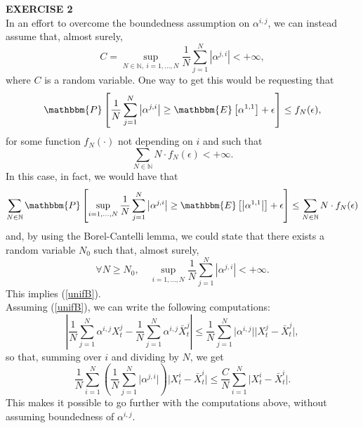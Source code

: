 \documentclass[11pt, a4paper]{article}
\begin{document}
\textbf{EXERCISE 2} \\
In an effort to overcome the boundedness assumption on $\alpha^{i, j}$, we can instead assume that, almost surely, \begin{equation} \label{unifB} C = \sup_{N \in \mathbb{N}, \ i = 1, ..., N} \frac{1}{N} \sum_{j = 1}^N \left| \alpha^{j, i} \right| < +\infty, \end{equation} where $C$ is a random variable. One way to get this would be requesting that \[ \mathbbm{P} \left[ \frac{1}{N} \sum_{j = 1}^N \left| \alpha^{j, i} \right| \geq \mathbbm{E} \left[ \alpha^{1, 1} \right] + \epsilon \right] \leq f_N(\epsilon), \] for some function $f_N(\cdot)$ not depending on $i$ and such that \[ \sum_{N \in \mathbb{N}} N \cdot f_N(\epsilon) < +\infty. \] In this case, in fact, we would have that \[ \sum_{N \in \mathbb{N}} \mathbbm{P} \left[ \sup_{i = 1, ..., N} \frac{1}{N} \sum_{j = 1}^N \left| \alpha^{j, i} \right| \geq \mathbbm{E} \left[ \left| \alpha^{1, 1} \right| \right] + \epsilon \right] \leq \sum_{N \in \mathbb{N}} N \cdot f_N(\epsilon) \] and, by using the Borel-Cantelli lemma, we could state that there exists a random variable $N_0$ such that, almost surely, \[ \forall N \geq N_0, \quad \sup_{i = 1, ..., N} \frac{1}{N} \sum_{j = 1}^N \left| \alpha^{j, i} \right| < +\infty. \] This implies (\ref{unifB}). \\
Assuming (\ref{unifB}), we can write the following computations:
\[ \left| \frac{1}{N} \sum_{j = 1}^N \alpha^{i, j} X^j_t - \frac{1}{N} \sum_{j = 1}^N \alpha^{i, j} \bar{X}^j_t \right| \leq \frac{1}{N} \sum_{j = 1}^N \big| \alpha^{i, j} \big| \Big| X^j_t - \bar{X}^j_t \Big|, \] so that, summing over $i$ and dividing by $N$, we get \[ \frac{1}{N} \sum_{i = 1}^N \left( \frac{1}{N} \sum_{j = 1}^N \big| \alpha^{j, i} \big| \right) \Big| X^i_t - \bar{X}^i_t \Big| \leq \frac{C}{N} \sum_{i = 1}^N \Big| X^i_t - \bar{X}^i_t \Big|. \]
This makes it possible to go further with the computations above, without assuming boundedness of $\alpha^{i, j}$. \\
\end{document}
